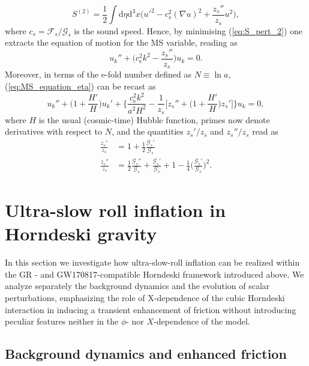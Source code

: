 \documentclass[nofootinbib,aps,a4paper,letterpaper,superscriptaddress,
twocolumn,times]{revtex4}
\renewcommand{\(}{\left(}
\renewcommand{\)}{\right)}
\renewcommand{\(}{\left(}
\renewcommand{\)}{\right)}
\renewcommand{\[}{\left[}
\renewcommand{\]}{\right]}
\begin{document}
\begin{equation}\label{eq:S_pert_2}
    S^{(2)}=\frac{1}{2}\int \mathrm{d}\eta \mathrm{d}^3x \bigg(u'^2 -c_s^2 
(\nabla u)^2 +\frac{z_s''}{z_s} u^2 \bigg),
\end{equation}
where $c_s=\mathcal{F}_s/\mathcal{G}_s$ is the sound speed.
Hence, by minimising (\ref{eq:S_pert_2})  one extracts the equation of 
motion for the MS variable, reading as 
\begin{equation}\label{eq:MS_equation_eta}
   u_{k}'' +\bigg(c_\mathrm{s}^2 k^2 -\frac{z_s''}{z_s} \bigg)u_k =0.
\end{equation}
Moreover,  in terms of the e-fold number defined as $N\equiv \ln a$,   
(\ref{eq:MS_equation_eta}) can be recast as
\begin{equation}
    u_{k}'' + \bigg(1 +\frac{H'}{H} \bigg) u_{k}' + \Bigg\{ \frac{c_\mathrm{s}^2 
k^2}{a^2 H^2} -\frac{1}{z_s} \bigg[z_s'' + \bigg(1 +\frac{H'}{H}\bigg)z_s' 
\bigg] \Bigg\} u_{k} =0,
\end{equation}
where $H$ is the usual (cosmic-time) Hubble function, primes now denote 
derivatives with respect to $N$, and the quantities $z_s'/z_s$ and  
$z_s''/z_s$ read as 
\begin{align}
    \frac{z_s'}{z_s} &=1 +\frac{1}{2}\frac{\mathcal{G}_s'}{\mathcal{G}_s} 
\nonumber \\
    \frac{z_s''}{z_s}&= \frac{1}{2}\frac{\mathcal{G}_s''}{\mathcal{G}_s} + 
\frac{\mathcal{G}_s'}{\mathcal{G}_s}+1 
-\frac{1}{4}\bigg(\frac{\mathcal{G}_s'}{\mathcal{G}_s} \bigg)^2.
\end{align}





\section{Ultra-slow roll inflation in Horndeski gravity}
\label{sec:USR_Inflation}

In this section we investigate how ultra-slow-roll inflation can be realized 
within the GR - and GW170817-compatible Horndeski framework introduced above. We analyze 
separately the background dynamics and the evolution of scalar perturbations, 
emphasizing the role of X-dependence of the cubic Horndeski interaction in inducing a transient 
enhancement of friction without introducing  peculiar features neither in the $\phi$- nor $X$-dependence of the model.



\subsection{Background dynamics and enhanced friction}
\label{subsec:USR_background}
\end{document}
